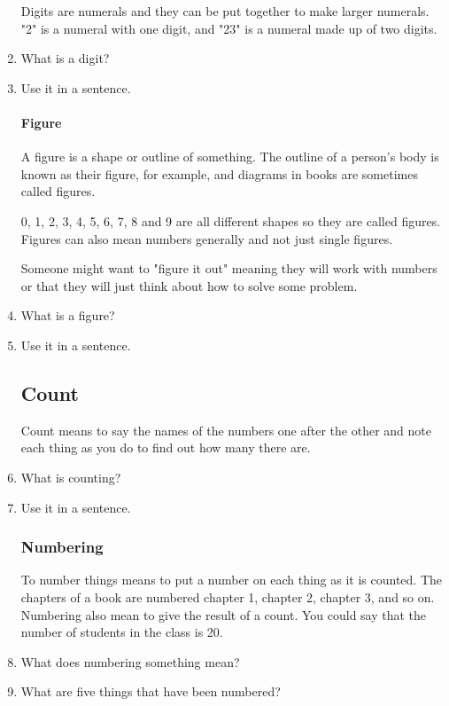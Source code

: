 \documentclass{article}
\begin{document}
\begin{enumerate}
Digits are numerals and they can be put together to make larger numerals. "2" is a numeral with one digit, and "23" is a numeral made up of two digits.

\item What is a digit?
\item Use it in a sentence.

\paragraph{Figure}

A figure is a shape or outline of something. The outline of a person's body is known as their figure, for example, and diagrams in books are sometimes called figures.

0, 1, 2, 3, 4, 5, 6, 7, 8 and 9 are all different shapes so they are called figures. Figures can also mean numbers generally and not just single figures.

Someone might want to "figure it out" meaning they will work with numbers or that they will just think about how to solve some problem.

\item What is a figure?
\item Use it in a sentence.

\subsection*{Count}
Count means to say the names of the numbers one after the other and note each thing as you do to find out how many there are.

\item What is counting?
\item Use it in a sentence.

\subsubsection*{Numbering} To number things means to put a number on each thing as it is counted. The chapters of a book are numbered chapter 1, chapter 2, chapter 3, and so on. Numbering also mean to give the result of a count. You could say that the number of students in the class is 20.

\item What does numbering something mean?
\item What are five things that have been numbered?

\newpage


\end{enumerate}
\end{document}
